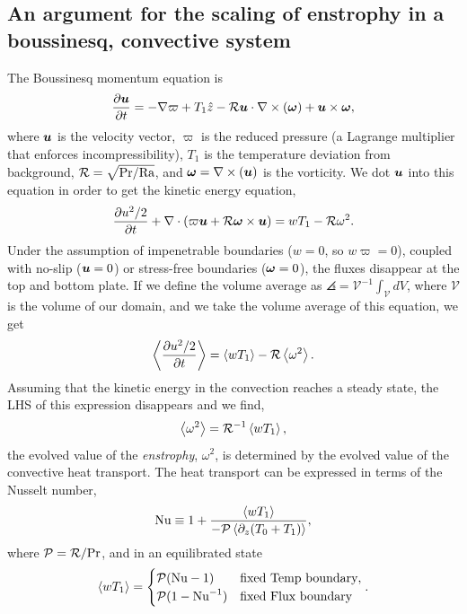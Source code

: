 \subsection{An argument for the scaling of enstrophy in a boussinesq, convective system}
\label{sec:enstrophy_scaling}
The Boussinesq momentum equation is
\begin{equation}
\frac{\partial \bm{u}}{\partial t} = -\nabla\varpi + T_1\hat{z} - \mathcal{R} \bm{u} \cdot \nabla \times \left(\bm{\omega}\right) + \bm{u} \times \bm{\omega},
\label{eqn:momentum}
\end{equation}
where $\bm{u}$ is the velocity vector, $\varpi$ is the reduced pressure (a Lagrange multiplier that enforces incompressibility), $T_1$ is the temperature deviation from background, $\mathcal{R} = \sqrt{\text{Pr}/\text{Ra}}$, and $\bm{\omega} = \nabla \times \left(\bm{u}\right)$ is the vorticity.
We dot $\bm{u}$ into this equation in order to get the kinetic energy equation,
\begin{equation}
\frac{\partial u^2/2}{\partial t} + \nabla\cdot\left( \varpi \bm{u} + \mathcal{R} \bm{\omega} \times \bm{u}\right) = w T_1 - \mathcal{R} \omega^2.
\end{equation}
Under the assumption of impenetrable boundaries ($w = 0$, so $w\varpi = 0$), coupled with no-slip ($\bm{u} = 0$) or stress-free boundaries ($\bm{\omega} = 0$), the fluxes disappear at the top and bottom plate.
If we define the volume average as $\angles{} = \mathcal{V}^{-1}\int_{\mathcal{V}} dV$, where $\mathcal{V}$ is the volume of our domain, and we take the volume average of this equation, we get
\begin{equation}
\left\langle \frac{\partial u^2/2}{\partial t} \right\rangle = \left\langle w T_1 \right\rangle - \mathcal{R} \left\langle \omega^2 \right\rangle.
\end{equation}
Assuming that the kinetic energy in the convection reaches a steady state, the LHS of this expression disappears and we find,
\begin{equation}
\left\langle \omega^2 \right\rangle = \mathcal{R}^{-1} \left\langle w T_1 \right\rangle,
\end{equation}
the evolved value of the \emph{enstrophy}, $\omega^2$, is determined by the evolved value of the convective heat transport.
The heat transport can be expressed in terms of the Nusselt number, 
\begin{equation}
\text{Nu} \equiv 1 + \frac{\left\langle w T_1 \right\rangle}{-\mathcal{P} \left\langle \partial_z (T_0 + T_1) \right\rangle},
\end{equation}
where $\mathcal{P} = \mathcal{R}/\text{Pr}$, and in an equilibrated state
\begin{equation}
\left\langle w T_1 \right\rangle = 
\begin{cases}
\mathcal{P} (\text{Nu} - 1)  & \text{fixed Temp boundary}, \\
\mathcal{P} (1 - \text{Nu}^{-1}) & \text{fixed Flux boundary}
\end{cases}.
\end{equation}
